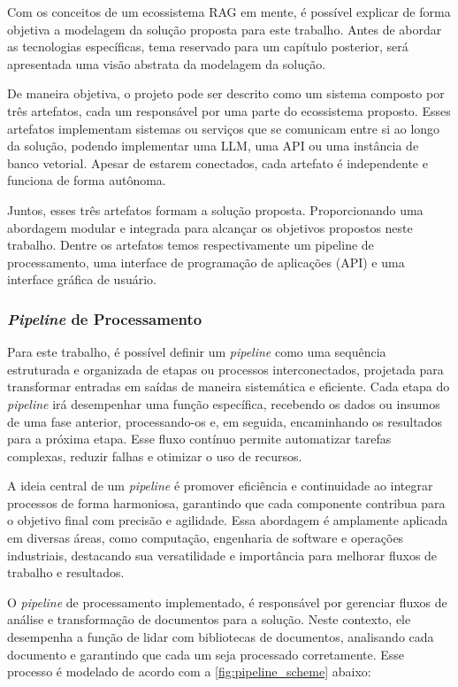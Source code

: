 \documentclass[a4paper, 12pt]{article}
\begin{document}
    Com os conceitos de um ecossistema RAG em mente, é possível explicar de forma objetiva a modelagem da solução proposta para este trabalho. Antes de abordar as tecnologias específicas, tema reservado para um capítulo posterior, será apresentada uma visão abstrata da modelagem da solução.

    De maneira objetiva, o projeto pode ser descrito como um sistema composto por três artefatos, cada um responsável por uma parte do ecossistema proposto. Esses artefatos implementam sistemas ou serviços que se comunicam entre si ao longo da solução, podendo implementar uma LLM, uma API ou uma instância de banco vetorial. Apesar de estarem conectados, cada artefato é independente e funciona de forma autônoma.
    
    Juntos, esses três artefatos formam a solução proposta. Proporcionando uma abordagem modular e integrada para alcançar os objetivos propostos neste trabalho. Dentre os artefatos temos respectivamente um pipeline de processamento, uma interface de programação de aplicações (API) e uma interface gráfica de usuário.
    
    \subsubsection{\textit{Pipeline} de Processamento} \label{sec:pipeline}

    Para este trabalho, é possível definir um \textit{pipeline} como uma sequência estruturada e organizada de etapas ou processos interconectados, projetada para transformar entradas em saídas de maneira sistemática e eficiente. Cada etapa do \textit{pipeline} irá desempenhar uma função específica, recebendo os dados ou insumos de uma fase anterior, processando-os e, em seguida, encaminhando os resultados para a próxima etapa. Esse fluxo contínuo permite automatizar tarefas complexas, reduzir falhas e otimizar o uso de recursos. 
    
    A ideia central de um \textit{pipeline} é promover eficiência e continuidade ao integrar processos de forma harmoniosa, garantindo que cada componente contribua para o objetivo final com precisão e agilidade. Essa abordagem é amplamente aplicada em diversas áreas, como computação, engenharia de software e operações industriais, destacando sua versatilidade e importância para melhorar fluxos de trabalho e resultados. 

    O \textit{pipeline} de processamento implementado, é responsável por gerenciar fluxos de análise e transformação de documentos para a solução. Neste contexto, ele desempenha a função de lidar com bibliotecas de documentos, analisando cada documento e garantindo que cada um seja processado corretamente. Esse processo é modelado de acordo com a \autoref{fig:pipeline_scheme} abaixo:
    
\end{document}
